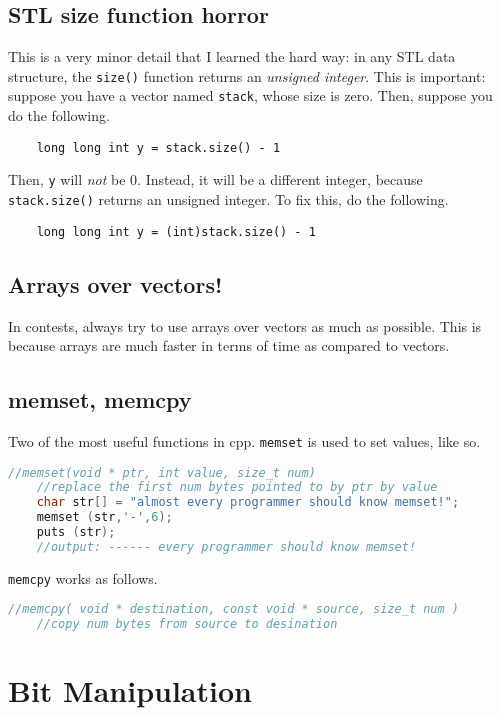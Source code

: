 \documentclass[12pt,a4paper]{amsart}
\numberwithin{equation}{section}
\theoremstyle{definition}
\begin{document}
\subsection{STL size function horror} This is a very minor detail that I learned the hard way: in any STL data structure, the \verb|size()| function returns an \textit{unsigned integer}. This is important: suppose you have a vector named \verb|stack|, whose size is zero. Then, suppose you do the following. 
\begin{verbatim}
    long long int y = stack.size() - 1
\end{verbatim}
Then, \verb|y| will \textit{not} be 0. Instead, it will be a different integer, because \verb|stack.size()| returns an unsigned integer. To fix this, do the following. 
\begin{verbatim}
    long long int y = (int)stack.size() - 1
\end{verbatim}

\subsection{Arrays over vectors!} In contests, always try to use arrays over vectors as much as possible. This is because arrays are much faster in terms of time as compared to vectors. 

\subsection{memset, memcpy} Two of the most useful functions in cpp. \verb|memset| is used to set values, like so. 
\begin{lstlisting}[language=C++]
    //memset(void * ptr, int value, size_t num)
    //replace the first num bytes pointed to by ptr by value 
    char str[] = "almost every programmer should know memset!";
    memset (str,'-',6);
    puts (str);
    //output: ------ every programmer should know memset!
\end{lstlisting}

\verb|memcpy| works as follows. 

\begin{lstlisting}[language=C++]
    //memcpy( void * destination, const void * source, size_t num )
    //copy num bytes from source to desination
\end{lstlisting}

\section{Bit Manipulation}
\end{document}
